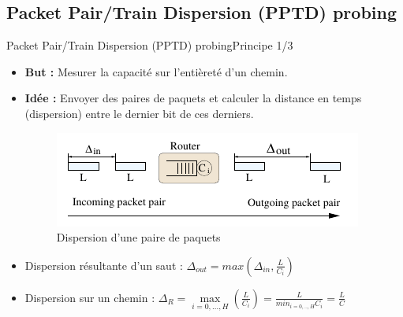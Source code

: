 \documentclass[compress]{beamer}
\begin{document}

\subsection{Packet Pair/Train Dispersion (PPTD) probing}
\begin{frame}{Packet Pair/Train Dispersion (PPTD) probing}{Principe 1/3}
\begin{itemize}
	\item \textbf{But :} Mesurer la {\color{red}capacité} sur l'entièreté d'un chemin. 
	\pause
	\item \textbf{Idée :} Envoyer des {\color{red}paires de paquets} et calculer la distance en temps (dispersion) entre le dernier bit de ces derniers. 
	\begin{figure}[hbtp]
		\centering
		\includegraphics[scale=0.6]{schema5.png}
		\caption{Dispersion d'une paire de paquets}
	\end{figure}
	\item Dispersion résultante d'un saut : $\Delta_{out} = max (\Delta_{in} , \frac{L}{C_i})$
	\item Dispersion sur un chemin : $\Delta_R = \max\limits_{i=0,...,H} (\frac{L}{C_i}) = \frac{L}{min_{i=0,..,H}C_i} = \frac{L}{C}$
\end{itemize}
\end{frame}

\end{document}
